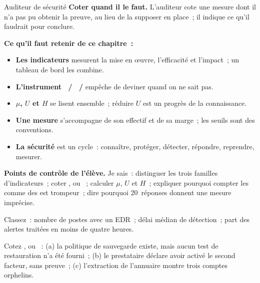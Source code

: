 \begin{boxmetier}{Auditeur de sécurité}
\textbf{Coter \NEK{} quand il le faut.} L'auditeur cote \NEK{} une mesure
dont il n'a pas pu obtenir la preuve, au lieu de la supposer en place~;
il indique ce qu'il faudrait pour conclure.
\end{boxmetier}

\separateur

\begin{boxresume}
\textbf{Ce qu'il faut retenir de ce chapitre~:}
\begin{itemize}
    \item \textbf{Les indicateurs} mesurent la mise en œuvre, l'efficacité
          et l'impact~; un tableau de bord les combine.
    \item \textbf{L'instrument \OUI{}~/ \NON{}~/ \NEK{}} empêche de
          deviner quand on ne sait pas.
    \item \textbf{\(\mu\), \(U\) et \(H\)} se lisent ensemble~; réduire
          \(U\) est un progrès de la connaissance.
    \item \textbf{Une mesure} s'accompagne de son effectif et de sa marge~;
          les seuils sont des conventions.
    \item \textbf{La sécurité} est un cycle~: connaître, protéger,
          détecter, répondre, reprendre, mesurer.
\end{itemize}
\end{boxresume}

\begin{boxinfo}
\textbf{Points de contrôle de l'élève.} Je sais~: distinguer les trois
familles d'indicateurs~; coter \OUI{}, \NON{} ou \NEK{}~; calculer
\(\mu\), \(U\) et \(H\)~; expliquer pourquoi compter les \NEK{} comme des
\OUI{} est trompeur~; dire pourquoi 20~réponses donnent une mesure
imprécise.
\end{boxinfo}

\bigskip

\begin{boxexo}[title={\ding{45}\quad Exercice~26.1. Quelle famille~? \niveaubase}]
Classez~: nombre de postes avec un EDR~; délai médian de détection~; part
des alertes traitées en moins de quatre heures.
\end{boxexo}

\begin{boxexo}[title={\ding{45}\quad Exercice~26.2. Coter \niveaubase}]
Cotez \OUI{}, \NON{} ou \NEK{}~: (a) la politique de sauvegarde existe,
mais aucun test de restauration n'a été fourni~; (b) le prestataire
déclare avoir activé le second facteur, sans preuve~; (c) l'extraction de
l'annuaire montre trois comptes orphelins.
\end{boxexo}

